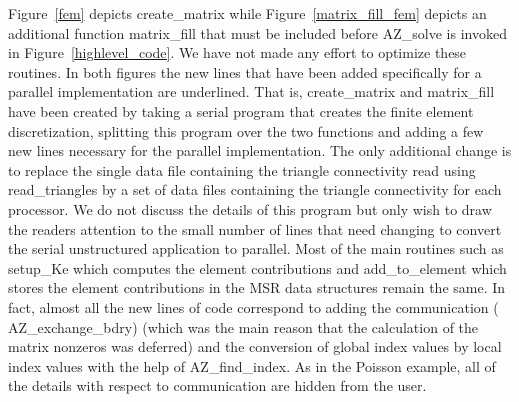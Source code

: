 Figure~\ref{fem} depicts {\sf create\_matrix} while
Figure~\ref{matrix_fill_fem} depicts an additional function {\sf matrix\_fill}
that must be included before {\sf AZ\_solve} is invoked in
Figure~\ref{highlevel_code}.  We have not made any effort to optimize these
routines. In both figures the new lines that have been added specifically for a
parallel implementation are underlined.  That is, {\sf create\_matrix} and {\sf
  matrix\_fill} have been created by taking a serial program that creates the
finite element discretization, splitting this program over the two functions
and adding a few new lines necessary for the parallel implementation.  The only
additional change is to replace the single data file containing the triangle
connectivity read using {\sf read\_triangles} by a set of data files containing
the triangle connectivity for each processor.  We do not discuss the details of
this program but only wish to draw the readers attention to the small number of
lines that need changing to convert the serial unstructured application to
parallel.  Most of the main routines such as {\sf setup\_Ke} which computes the
element contributions and {\sf add\_to\_element} which stores the element
contributions in the MSR data structures remain the same.  In fact, almost all
the new lines of code correspond to adding the communication ({\sf
  AZ\_exchange\_bdry}) (which was the main reason that the calculation of the
matrix nonzeros was deferred) and the conversion of global index values by
local index values with the help of {\sf AZ\_find\_index}.  As in the Poisson
example, all of the details with respect to communication are hidden from the
user.
